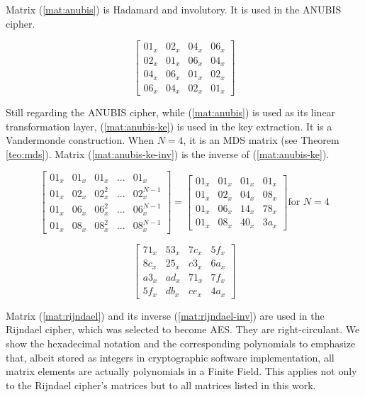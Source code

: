 Matrix (\ref{mat:anubis}) is Hadamard and involutory. It is used in the ANUBIS \cite{ANUBIS2000} cipher.

\begin{equation}\label{mat:anubis}
\begin{bmatrix}
01_x & 02_x & 04_x & 06_x\\
02_x & 01_x & 06_x & 04_x\\
04_x & 06_x & 01_x & 02_x\\
06_x & 04_x & 02_x & 01_x
\end{bmatrix}
\end{equation}

Still regarding the ANUBIS cipher, while (\ref{mat:anubis}) is used as its linear transformation layer, (\ref{mat:anubis-ke}) is used in the key extraction. It is a Vandermonde construction. When $N = 4$, it is an MDS matrix (see Theorem \ref{teo:mds}). Matrix (\ref{mat:anubis-ke-inv}) is the inverse of (\ref{mat:anubis-ke}).

\begin{equation}\label{mat:anubis-ke}
\begin{bmatrix}
01_x & 01_x & 01_x & ... & 01_x\\
01_x & 02_x & 02_x^2 & ... & 02_x^{N-1}\\
01_x & 06_x & 06_x^2 & ... & 06_x^{N-1}\\
01_x & 08_x & 08_x^2 & ... & 08_x^{N-1}
\end{bmatrix}
=
\begin{bmatrix}
01_x & 01_x & 01_x & 01_x\\
01_x & 02_x & 04_x & 08_x\\
01_x & 06_x & 14_x & 78_x\\
01_x & 08_x & 40_x & 3a_x
\end{bmatrix} \text{for } N=4
\end{equation}

\begin{equation}\label{mat:anubis-ke-inv}
\begin{bmatrix}
71_x & 53_x & 7c_x & 5f_x\\
8c_x & 25_x & c3_x & 6a_x\\
a3_x & ad_x & 71_x & 7f_x\\
5f_x & db_x & ce_x & 4a_x
\end{bmatrix}
\end{equation}

Matrix (\ref{mat:rijndael}) and its inverse (\ref{mat:rijndael-inv}) are used in the Rijndael \cite{DesignOfRijndael2002} cipher, which was selected to become AES. They are right-circulant. We show the hexadecimal notation and the corresponding polynomials to emphasize that, albeit stored as integers in cryptographic software implementation, all matrix elements are actually polynomials in a Finite Field. This applies not only to the Rijndael cipher's matrices but to all matrices listed in this work.

